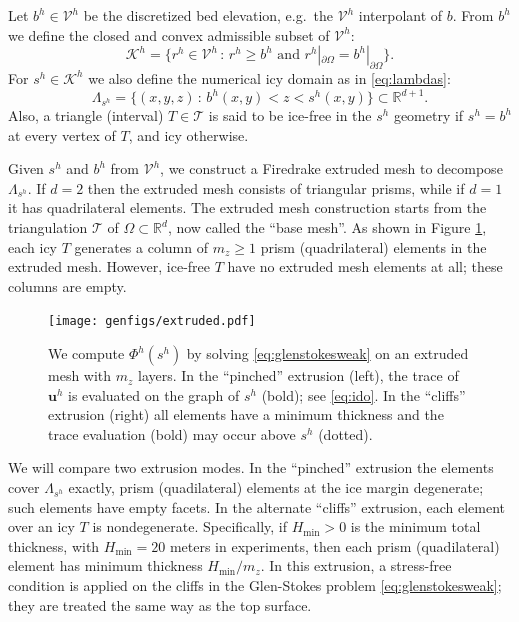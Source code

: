 \documentclass[letterpaper,final,12pt,reqno]{amsart}
\theoremstyle{claim}
\newcommand{\RR}{\mathbb{R}}
\newcommand{\bu}{\mathbf{u}}
\numberwithin{equation}{section}
\numberwithin{figure}{section}
\numberwithin{table}{section}
\numberwithin{theorem}{section}
\begin{document}
Let $b^h \in \mathcal{V}^h$ be the discretized bed elevation, e.g.~the $\mathcal{V}^h$ interpolant of $b$.  From $b^h$ we define the closed and convex admissible subset of $\mathcal{V}^h$:
\begin{equation}
\mathcal{K}^h = \{r^h \in \mathcal{V}^h \,:\, r^h \ge b^h \text{ and } r^h|_{\partial\Omega} = b^h|_{\partial\Omega}\}.  \label{eq:feK}
\end{equation}
For $s^h\in \mathcal{K}^h$ we also define the numerical icy domain as in \eqref{eq:lambdas}:
\begin{equation}
\Lambda_{s^h} = \{(x,y,z)\,:\,b^h(x,y) < z < s^h(x,y)\} \subset \RR^{d+1}.  \label{eq:felambdas}
\end{equation}
Also, a triangle (interval) $T\in\mathcal{T}$ is said to be ice-free in the $s^h$ geometry if $s^h=b^h$ at every vertex of $T$, and icy otherwise.

Given $s^h$ and $b^h$ from $\mathcal{V}^h$, we construct a Firedrake extruded mesh \cite{McRaeetal2016} to decompose $\Lambda_{s^h}$.  If $d=2$ then the extruded mesh consists of triangular prisms, while if $d=1$ it has quadrilateral elements.  The extruded mesh construction starts from the triangulation $\mathcal{T}$ of $\Omega \subset \RR^d$, now called the ``base mesh''.  As shown in Figure \ref{fig:extruded}, each icy $T$ generates a column of $m_z \ge 1$ prism (quadrilateral) elements in the extruded mesh.  However, ice-free $T$ have no extruded mesh elements at all; these columns are empty.

\begin{figure}[t]
\begin{center}
\texttt{[image: genfigs/extruded.pdf]}
\end{center}
\caption{We compute $\Phi^h(s^h)$ by solving \eqref{eq:glenstokesweak} on an extruded mesh with $m_z$ layers.  In the ``pinched'' extrusion (left), the trace of $\bu^h$ is evaluated on the graph of $s^h$ (bold); see \eqref{eq:ido}.  In the ``cliffs'' extrusion (right) all elements have a minimum thickness and the trace evaluation (bold) may occur above $s^h$ (dotted).}
\label{fig:extruded}
\end{figure}

We will compare two extrusion modes.  In the ``pinched'' extrusion the elements cover $\Lambda_{s^h}$ exactly, prism (quadilateral) elements at the ice margin degenerate; such elements have empty facets.  In the alternate ``cliffs'' extrusion, each element over an icy $T$ is nondegenerate.  Specifically, if $H_{\text{min}} > 0$ is the minimum total thickness, with $H_{\text{min}} = 20$ meters in experiments, then each prism (quadilateral) element has minimum thickness $H_{\text{min}}/m_z$.  In this extrusion, a stress-free condition is applied on the cliffs  in the Glen-Stokes problem \eqref{eq:glenstokesweak}; they are treated the same way as the top surface.
\end{document}
